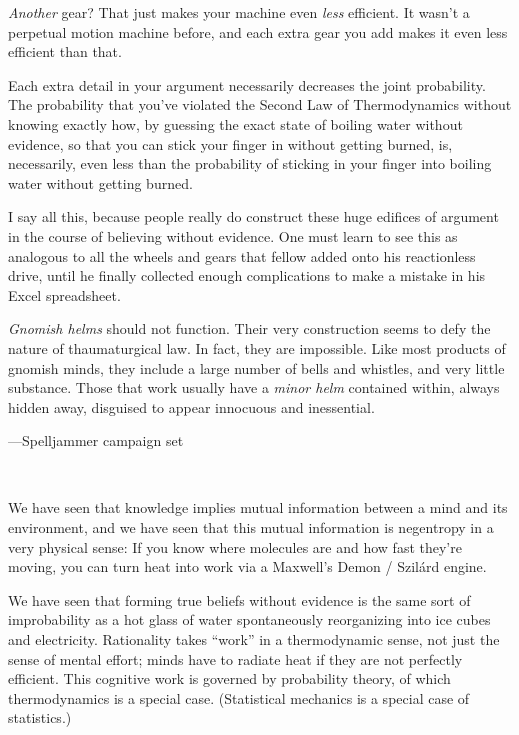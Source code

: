 {
 \textit{Another} gear? That just makes your machine even
\textit{less} efficient. It wasn't a perpetual motion
machine before, and each extra gear you add makes it even less
efficient than that.}

{
 Each extra detail in your argument necessarily decreases the joint
probability. The probability that you've violated the
Second Law of Thermodynamics without knowing exactly how, by guessing
the exact state of boiling water without evidence, so that you can
stick your finger in without getting burned, is, necessarily, even less
than the probability of sticking in your finger into boiling water
without getting burned.}

{
 I say all this, because people really do construct these huge
edifices of argument in the course of believing without evidence. One
must learn to see this as analogous to all the wheels and gears that
fellow added onto his reactionless drive, until he finally collected
enough complications to make a mistake in his Excel spreadsheet.}

\myendsectiontext


{
 \textit{Gnomish helms} should not function. Their very
construction seems to defy the nature of thaumaturgical law. In fact,
they are impossible. Like most products of gnomish minds, they include
a large number of bells and whistles, and very little substance. Those
that work usually have a \textit{minor helm} contained within, always
hidden away, disguised to appear innocuous and inessential.}

{\raggedleft
 {}---Spelljammer campaign set
\par}


\bigskip

{
 ~}

{
 We have seen that knowledge implies mutual information between a
mind and its environment, and we have seen that this mutual information
is negentropy in a very physical sense: If you know where molecules are
and how fast they're moving, you can turn heat into
work via a Maxwell's Demon / Szilárd engine.}

{
 We have seen that forming true beliefs without evidence is the
same sort of improbability as a hot glass of water spontaneously
reorganizing into ice cubes and electricity. Rationality takes
``work'' in a thermodynamic sense,
not just the sense of mental effort; minds have to radiate heat if they
are not perfectly efficient. This cognitive work is governed by
probability theory, of which thermodynamics is a special case.
(Statistical mechanics is a special case of statistics.)}

